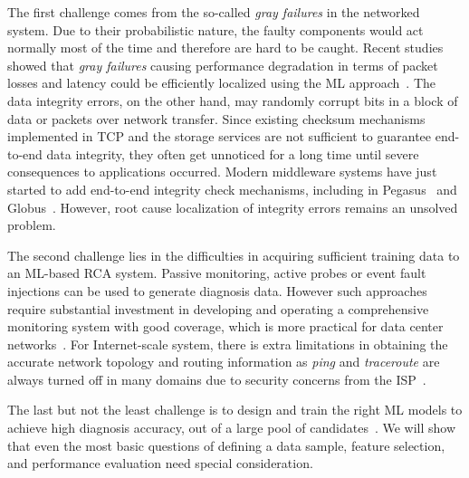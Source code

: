 The first challenge comes from the so-called {\it gray failures} in the networked system. Due to their probabilistic nature, the faulty components would act normally most of the time and therefore are hard to be caught. Recent studies showed that {\it gray failures} causing performance degradation in terms of packet losses and latency could be efficiently localized using the ML approach~\cite{GrayFailure:2017,DeepView:NSDI18}.  The data integrity errors, on the other hand, may randomly corrupt bits in a block of data or packets over network transfer. Since existing checksum mechanisms implemented in TCP and the storage services are not sufficient to guarantee end-to-end data integrity, they often get unnoticed for a long time until severe consequences to applications occurred. Modern middleware systems have just started to add end-to-end integrity check mechanisms, including in Pegasus~\cite{swip:pearc:2019} and Globus~\cite{IntegrityVerification:DataTransfer}. However, root cause localization of integrity errors remains an unsolved problem.

The second challenge lies in the difficulties in acquiring sufficient training data to an ML-based RCA system.  Passive monitoring, active probes or event fault injections can be used to generate diagnosis data. However such approaches require substantial investment in developing and operating a comprehensive monitoring system with good coverage, which is more practical for data center networks~\cite{active:iot:2019, NetPoirot:Sigcomm2016}. For Internet-scale system, there is extra limitations in obtaining the accurate network topology and routing information as {\it ping} and {\it traceroute} are always turned off in many domains due to security concerns from the ISP~\cite{topology_obf_20}.

The last but not the least challenge is to design and train the right ML models to achieve high diagnosis accuracy, out of a large pool of candidates~\cite{Boutaba:2018aa}. We will show that even the most basic questions of defining a data sample, feature selection, and performance evaluation need special consideration.

